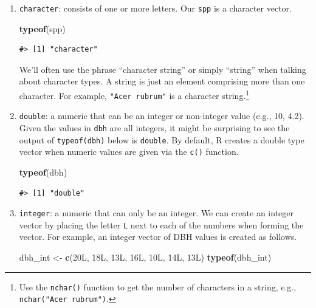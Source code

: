 \documentclass[
  11pt,
]{krantz}
\newenvironment{Shaded}{\begin{snugshade}}{\end{snugshade}}
\newcommand{\KeywordTok}[1]{\textcolor[rgb]{0.13,0.29,0.53}{\textbf{#1}}}
\newcommand{\NormalTok}[1]{#1}
\newcommand{\StringTok}[1]{\textcolor[rgb]{0.31,0.60,0.02}{#1}}
\theoremstyle{definition}
\theoremstyle{definition}
\theoremstyle{definition}
\theoremstyle{definition}
\theoremstyle{remark}
\begin{document}
\begin{enumerate}
\def\labelenumi{\arabic{enumi}.}
\item
  \texttt{character}: consists of one or more letters. Our \texttt{spp} is a character vector.

\begin{Shaded}
\begin{Highlighting}[]
\KeywordTok{typeof}\NormalTok{(spp)}
\end{Highlighting}
\end{Shaded}

\begin{verbatim}
#> [1] "character"
\end{verbatim}

  We'll often use the phrase ``character string'' or simply ``string'' when talking about character types. A string is just an element comprising more than one character. For example, \texttt{"Acer\ rubrum"} is a character string.\footnote{Use the \texttt{nchar()} function to get the number of characters in a string, e.g., \texttt{nchar("Acer\ rubrum")}.}
\item
  \texttt{double}: a numeric that can be an integer or non-integer value (e.g., 10, 4.2). Given the values in \texttt{dbh} are all integers, it might be surprising to see the output of \texttt{typeof(dbh)} below is \texttt{double}. By default, R creates a double type vector when numeric values are given via the \texttt{c()} function.

\begin{Shaded}
\begin{Highlighting}[]
\KeywordTok{typeof}\NormalTok{(dbh)}
\end{Highlighting}
\end{Shaded}

\begin{verbatim}
#> [1] "double"
\end{verbatim}
\item
  \texttt{integer}: a numeric that can only be an integer. We can create an integer vector by placing the letter \texttt{L} next to each of the numbers when forming the vector. For example, an integer vector of DBH values is created as follows.

\begin{Shaded}
\begin{Highlighting}[]
\NormalTok{dbh\_int \textless{}{-}}\StringTok{ }\KeywordTok{c}\NormalTok{(20L, 18L, 13L, 16L, 10L, 14L, 13L)}
\KeywordTok{typeof}\NormalTok{(dbh\_int)}
\end{Highlighting}
\end{Shaded}


\end{enumerate}
\end{document}
